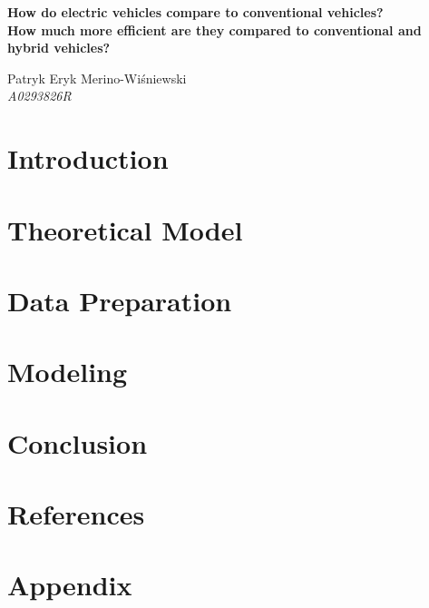 \documentclass[10pt]{article}
\begin{document}
\pagestyle{fancy}

\renewcommand*{\thefootnote}{\fnsymbol{footnote}}

\begin{center}
	\Large{\textbf{How do electric vehicles compare to conventional vehicles? \\How much more efficient are they compared to conventional and hybrid vehicles?}}
	\normalsize

	Patryk Eryk Merino-Wiśniewski\\
	\vspace{0.1cm}
	\textit{A0293826R}
	\medskip
	\normalsize
\end{center}

\begin{multicols}{2}

		
	\section{Introduction}
		
		
	\section{Theoretical Model}\label{sec: The_mod}
		

	\section{Data Preparation}\label{sec: Data}
		
		
	\section{Modeling}\label{sec: Modeling}
		

	\section{Conclusion}\label{sec: Con}
		
	
	\section*{References}
		\printbibliography[type=book, title={Books}]
		\printbibliography[type=article, title={Articles}]
		\printbibliography[type=misc, title={Lectures}]
		\printbibliography[type=online, title={Online Resources}]

\clearpage
\end{multicols}

\section{Appendix} \label{sec: apx}
	
\end{document}
